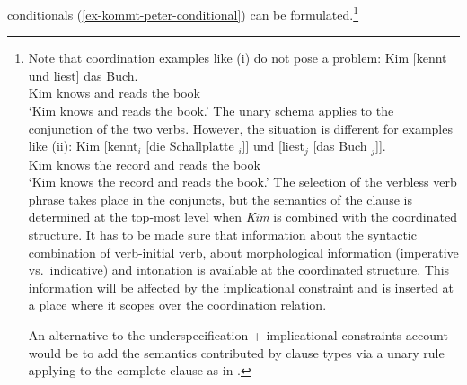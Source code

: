 \documentclass[output=paper,biblatex,babelshorthands,newtxmath,draftmode,colorlinks,citecolor=brown]{langscibook}
\begin{document}
conditionals (\ref{ex-kommt-peter-conditional}) can be formulated.\footnote{
  Note that coordination examples like (i) do not pose a problem:
\ea
\gll Kim [kennt und liest] das Buch.\\
     Kim \spacebr{}knows and reads the book\\
\glt `Kim knows and reads the book.'
\z
The unary schema applies to the conjunction of the two verbs. However, the situation is different
for examples like (ii):
\ea
\gll Kim [kennt$_i$      [die Schallplatte \trace$_i$]] und [liest$_j$ [das Buch \trace$_j$]].\\
     Kim \spacebr{}knows \spacebr{}the record {} and \spacebr{}reads \spacebr{}the book\\
\glt `Kim knows the record and reads the book.'
\z
The selection of the verbless verb phrase takes place in the conjuncts, but the semantics of the
clause is determined at the top-most level when \emph{Kim} is combined with the coordinated
structure. It has to be made sure that information about the syntactic combination of verb-initial
verb, about morphological information (imperative vs.\ indicative) and intonation is available at
the coordinated structure. This information will be affected by the implicational constraint and is
inserted at a place where it scopes over the coordination relation. 
%

An alternative to the underspecification + implicational constraints account would be to add the semantics contributed by clause types via a unary rule applying
to the complete clause as in .
}
\end{document}

